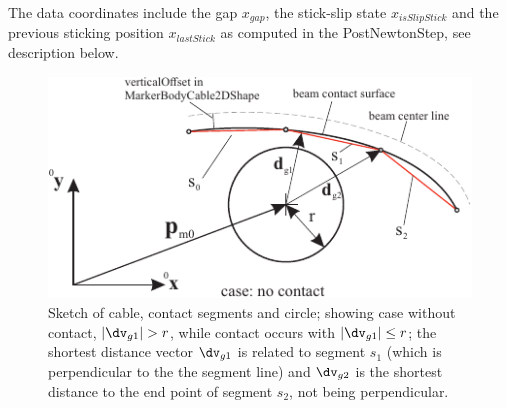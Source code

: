     {The data coordinates include the gap $x_{gap}$, the stick-slip state $x_{isSlipStick}$ and the previous sticking position $x_{lastStick}$ as computed in the PostNewtonStep, see description below. }
    \finishTable
    \begin{figure}[tbph]
      \begin{center}
      \includegraphics[width=12cm]{figures/ContactFrictionCircleCable2D.pdf}
      \end{center}
      \caption{Sketch of cable, contact segments and circle; showing case without contact, $|\dv_{g1}| > r$, 
               while contact occurs with $|\dv_{g1}| \le r$; the shortest distance vector $\dv_{g1}$
               is related to segment $s_1$ (which is perpendicular to the the segment line) and 
               $\dv_{g2}$ is the shortest distance to the end point of segment $s_2$, not being
               perpendicular.}
    	\label{fig:ObjectContactFrictionCircleCable2D:sketch}
    \end{figure}
